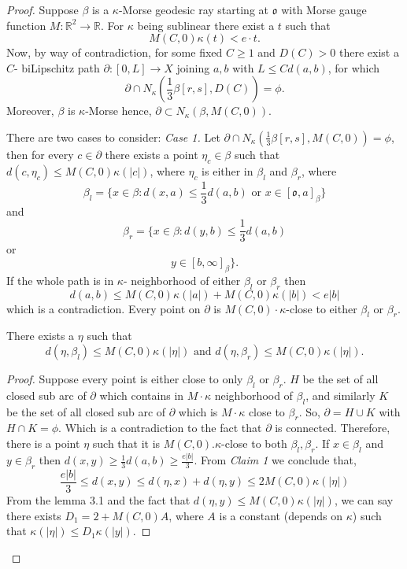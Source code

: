 \documentclass[10pt,a4paper]{amsart}
\newcommand{\p}{\partial}
\begin{document}
\begin{proof}
    Suppose $\beta$ is a $\kappa$-Morse geodesic ray starting at $\mathfrak{o}$ with Morse gauge function $M:\mathbb{R}^2 \rightarrow \mathbb{R}$. For $\kappa$ being sublinear there exist a $t$ such that 
    \[M(C,0)\kappa(t)< e\cdot t.\] Now, by way of contradiction, for some fixed $C\geq 1$ and $D(C)>0$ there exist a $C$- biLipschitz path $\p:[0,L]\rightarrow X$ joining $a,b$ with $L \leq Cd(a,b)$, for which \[\p \cap N_\kappa(\frac{1}{3}\beta[r,s], D(C))= \phi.\]  Moreover, $\beta$ is $\kappa$-Morse hence, $\p \subset N_\kappa(\beta, M(C,0))$.  
    
    
    There are two cases to consider:\newline
    \textit{Case 1.} Let $\p \cap N_\kappa(\frac{1}{3}\beta[r,s], M(C,0))= \phi $, then for every $c \in \p$ there exists a point $\eta_c\in \beta $ such that $d(c,\eta_c)\leq M(C,0)\kappa(|c|)$, where $\eta_c$ is either in $\beta_l$ and $\beta_r$, where \[\beta_l=\{x \in \beta : d(x,a)\leq \frac{1}{3}d(a,b) \text{ or } x\in [\mathfrak{o},a]_{\beta}\}\]
    and \[\beta_r= \{x \in \beta : d(y,b)\leq \frac{1}{3}d(a,b)\]
     or \[ y\in [b,\infty]_{\beta} \}.\] If the whole path is in $\kappa$- neighborhood of either $\beta_l$ or $\beta_r$ then \[d(a,b) \leq M(C,0)\kappa(|a|)+M(C,0)\kappa(|b|)< e|b|\]
     which is a contradiction. Every point on $\p$ is $M(C,0)\cdot \kappa$-close to either $\beta_l$ or $\beta_r$.
\begin{claim}There exists a $\eta$ such that \[d(\eta,\beta_l)\leq M(C,0)\kappa(|\eta|) \text{ and } d(\eta,\beta_r)\leq M(C,0)\kappa(|\eta|).\] 
\end{claim}
\begin{proof} Suppose every point is either close to only $\beta_l$ or $\beta_r$. 
$H$ be the set of all closed sub arc of $\p$ which contains in $M\cdot\kappa$ neighborhood of $\beta_l$, and similarly $K$ be the set of all closed sub arc of $\p$ which is $M\cdot\kappa$ close to $\beta_r$.  So, $\p=H \cup K$ with$H \cap K = \phi$. Which is a contradiction to the fact that $\p$ is connected. Therefore, there is a point $\eta$ such that it is $M(C,0).\kappa$-close to both $\beta_l,\beta_r.$ \newline
If $x\in \beta_l$ and $y\in \beta_r$ then $d(x,y)\geq \frac{1}{3} d(a,b)\geq \frac{e|b|}{3}$. 
 From \textit{Claim 1} we conclude that, \[ \frac{e|b|}{3} \leq d(x,y) \leq d(\eta,x)+d(\eta,y)\leq 2 M(C,0) \kappa(|\eta|)\]
From the lemma 3.1 and the fact that $d(\eta,y)\leq M(C,0)\kappa(|\eta|)$, we can say there exists $D_1= 2+M(C,0)A$, where $A$ is a constant (depends on $\kappa$) such that $\kappa (|\eta|)\leq D_1 \kappa (|y|)$. 

\end{proof}
\end{proof}
\end{document}
